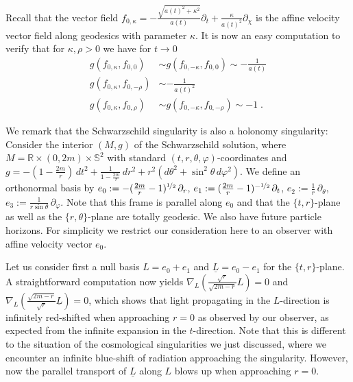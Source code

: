 \documentclass[reqno]{article}
\newcommand{\R}{\mathbb{R}}
\begin{document}
\begin{remark}
\begin{enumerate}
 Recall that the vector field $f_{0,\kappa} = -\frac{\sqrt{a(t)^2 + \kappa^2}}{a(t)} \partial_t + \frac{\kappa}{a(t)^2} \partial_\chi $ is the affine velocity vector field along geodesics with parameter $\kappa$. It is now an easy computation to verify that for $\kappa, \rho>0$ we have for $t \to 0$ 
\begin{align*}
g(f_{0,\kappa}, f_{0, 0}) &\sim g(f_{0,-\kappa}, f_{0,0}) \sim - \frac{1}{a(t)} \\
g(f_{0,\kappa}, f_{0, -\rho}) &\sim -\frac{1}{a(t)^2} \\
g(f_{0,\kappa}, f_{0, \rho}) &\sim g(f_{0,-\kappa}, f_{0, -\rho}) \sim -1 \;.
\end{align*}
\end{enumerate}
\end{remark}

\begin{remark} \label{RemSchwarz}
We remark that the Schwarzschild singularity is also a holonomy singularity: Consider the interior $(M,g)$ of the Schwarzschild solution, where $M = \R \times (0,2m) \times \mathbb{S}^2$ with standard $(t,r,\theta, \varphi)$-coordinates and $g = -(1 - \frac{2m}{r}) \, dt^2 + \frac{1}{1 - \frac{2m}{r}} \, dr^2 + r^2 (d\theta^2 + \sin^2 \theta \, d\varphi^2) $. We define an orthonormal basis by $e_0 := -(\frac{2m}{r} - 1)^{\nicefrac{1}{2}} \, \partial_r$, $e_1:= (\frac{2m}{r} - 1)^{-\nicefrac{1}{2}} \, \partial_t$, $e_2:= \frac{1}{r} \, \partial_\theta$, $e_3 := \frac{1}{r \sin\theta} \, \partial_\varphi$. Note that this frame is parallel along $e_0$ and that the $\{t,r\}$-plane as well as the $\{r, \theta\}$-plane are totally geodesic. We also have future particle horizons. For simplicity we restrict our consideration here to an observer with affine velocity vector $e_0$. 

Let us consider first a null basis $L = e_0 + e_1$ and $\underline{L} = e_0 - e_1$ for the $\{t,r\}$-plane. A straightforward computation now yields $\nabla_L( \frac{\sqrt{r}}{\sqrt{2m - r}} L) = 0$ and $\nabla_L( \frac{\sqrt{2m - r}}{\sqrt{r}}\underline{L}) = 0$, which shows that light propagating in the $L$-direction is infinitely red-shifted when approaching $r=0$ as observed by our observer, as expected from the infinite expansion in the $t$-direction. Note that this is different to the situation of the cosmological singularities we just discussed, where we encounter an infinite blue-shift of radiation approaching the singularity. However, now the parallel transport of $\underline{L}$ along $L$ blows up when approaching $r=0$. 


\end{remark}
\end{document}
